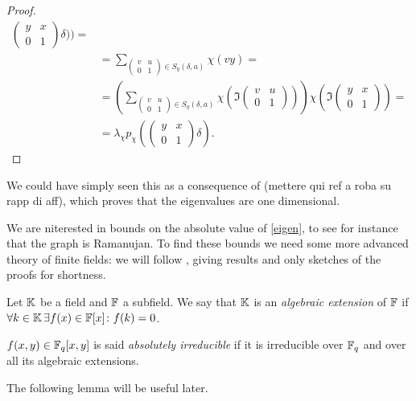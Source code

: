 \begin{prop}
\begin{proof}
\begin{align*}
	 \begin{pmatrix} y & x \\ 0 & 1 \end{pmatrix} \delta))=\\
	 &=\sum_{\begin{pmatrix} v & u \\ 0 & 1 \end{pmatrix} \in S_q(\delta,a)}\chi (vy)=\\
	 &=(\sum_{\begin{pmatrix} v & u \\ 0 & 1 \end{pmatrix} \in S_q(\delta,a)}\chi (\Im \begin{pmatrix} v & u \\ 0 & 1 \end{pmatrix}))\chi (\Im  \begin{pmatrix} y & x \\ 0 & 1 \end{pmatrix})=\\
	 &=\lambda_{\chi} p_{\chi} (\begin{pmatrix} y & x \\ 0 & 1 \end{pmatrix} \delta).
\end{align*}
\end{proof}
\end{prop}We could have simply seen this as a consequence of (mettere qui ref a roba su rapp di aff), which proves that the eigenvalues are one dimensional.

We are niterested in bounds on the absolute value of \ref{eigen}, to see for instance that the graph is Ramanujan. 
To find these bounds we need some more advanced theory of finite fields: we will follow \cite{schmidt1976equations},
giving results and only sketches of the proofs for shortness.
\begin{defn}
Let ${\mathbb K}$ be a field and ${\mathbb F}$ a subfield. We say that ${\mathbb K}$ is an \emph{algebraic extension} of ${\mathbb F}$ if
$\forall k \in {\mathbb K} \, \exists f(x) \in {\mathbb F}[x] \colon f(k)=0$.
\end{defn}
\begin{defn}
$f(x,y)\in {\mathbb F}_q[x,y]$ is said \emph{absolutely irreducible} if it is irreducible over ${\mathbb F}_q$ and over all its algebraic extensions.
\end{defn}
The following lemma will be useful later.

